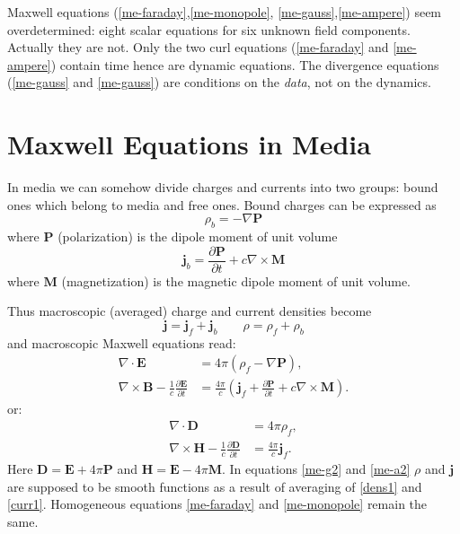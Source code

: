 Maxwell equations (\eqref{me-faraday},\eqref{me-monopole},
\eqref{me-gauss},\eqref{me-ampere}) seem overdetermined:
eight scalar equations for six unknown field components. Actually they are not. 
Only the two curl equations (\eqref{me-faraday} and  \eqref{me-ampere}) contain time
hence are dynamic equations. The divergence equations (\eqref{me-gauss} and  
\eqref{me-gauss}) are conditions on the \emph{data}, not on the dynamics.

\section{Maxwell Equations in Media}
\label{sec:ed-maxwell-eqs}

In media we can somehow divide charges and currents into two groups: 
bound ones which belong to media and free ones.
Bound charges can be expressed as
\begin{equation}
   \label {bound-charge}
   \rho_b=-\nabla \bm P
\end{equation}
where $ \bm P $  (polarization) is the dipole moment of unit volume
\begin{equation}
   \label {bound-current}
   \bm j_b =\frac{\partial \bm P}{\partial t}+ c \nabla \times \bm M
\end{equation}
where $ \bm M$ (magnetization) is the magnetic dipole moment of unit volume.

Thus macroscopic (averaged) charge and current densities become
\begin{equation}
   \label {tot-cur-ch}
   \bm j=\bm j_f+ \bm j_b \qquad \rho=\rho_f+\rho_b
\end{equation}
and macroscopic Maxwell equations read:
\begin{align}
    \nabla \cdot \bm{E} &= 4\pi (\rho_f -\nabla \bm P), \label{me-g1} \\
    \nabla \times \bm{B} - \frac{1}{c}\frac{\partial \bm{E}}{\partial t} &= 
    \frac{4\pi}{c}(\bm j_f+\frac{\partial \bm P}{\partial t}+ c \nabla \times \bm M). \label{me-a1}
\end{align}
or:
\begin{align}
    \nabla \cdot \bm D &= 4\pi \rho_f , \label{me-g2} \\
    \nabla \times \bm H - \frac{1}{c}\frac{\partial \bm D}{\partial t} &= \frac{4\pi}{c}\bm j_f . \label{me-a2}
\end{align}
Here $ \bm D = \bm E+4 \pi \bm P $ and $ \bm H = \bm E-4 \pi \bm M $.
In equations \eqref{me-g2} and \eqref{me-a2} $ \rho $ and $ \bm j $ are supposed to be smooth
functions as a result of averaging of \eqref{dens1} and \eqref{curr1}.
Homogeneous equations \eqref{me-faraday} and \eqref{me-monopole} remain the same.  

